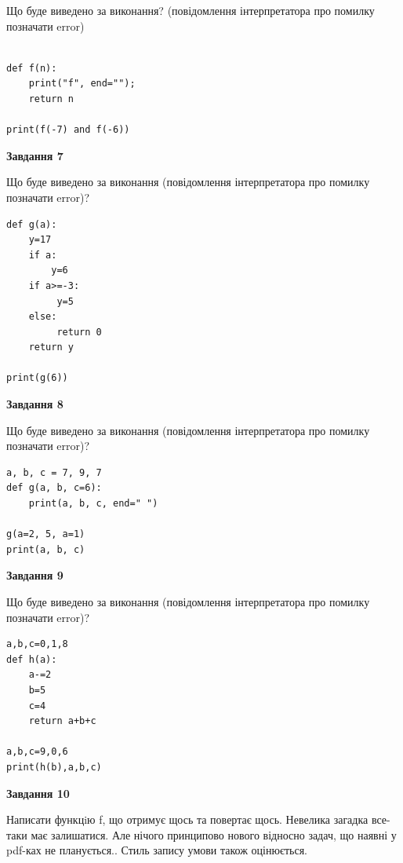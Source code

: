 \documentclass[12pt, ukrainian]{article}
\begin{document}
{\begin {large}
Що буде виведено за виконання? (повідомлення інтерпретатора про помилку позначати error)\par
\begin{verbatim}

def f(n):
    print("f", end="");
    return n

print(f(-7) and f(-6))
\end{verbatim}

{\begin {center}\textbf{Завдання 7}\end {center}}

Що буде виведено за виконання (повідомлення інтерпретатора про помилку позначати error)?\par
\begin{verbatim}
def g(a):
    y=17
    if a: 
        y=6
    if a>=-3:
         y=5
    else:
         return 0
    return y

print(g(6))
\end{verbatim}

{\begin {center}\textbf{Завдання 8}\end {center}}

Що буде виведено за виконання (повідомлення інтерпретатора про помилку позначати error)?\par
\begin{verbatim}
a, b, c = 7, 9, 7
def g(a, b, c=6):
    print(a, b, c, end=" ")

g(a=2, 5, a=1)
print(a, b, c)
\end{verbatim}

{\begin {center}\textbf{Завдання 9}\end {center}}

Що буде виведено за виконання (повідомлення інтерпретатора про помилку позначати error)?\par
\begin{verbatim}
a,b,c=0,1,8
def h(a):
    a-=2
    b=5
    c=4
    return a+b+c

a,b,c=9,0,6
print(h(b),a,b,c)
\end{verbatim}

{\begin {center}\textbf{Завдання 10}\end {center}}


Написати функцiю f, що отримує щось та повертає щось. Невелика загадка все-таки має залишатися. Але нічого принципово нового відносно задач, що наявні у pdf-ках не планується.. Стиль запису умови також оцінюється.\par
\end {large}}
\newpage
\end{document}
